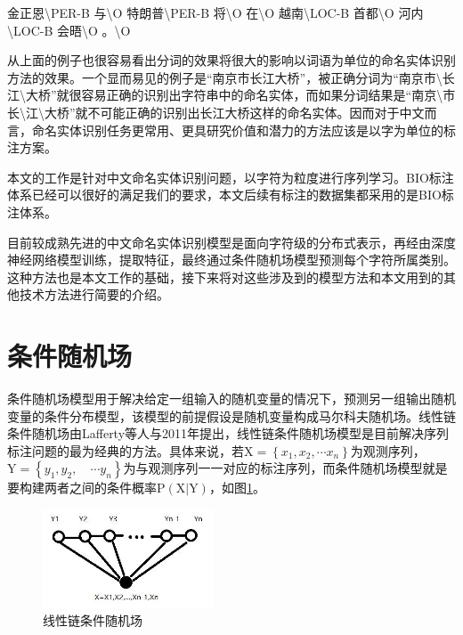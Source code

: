 \documentclass[winfonts,master,oneside,nobackinfo]{njuthesis}
\begin{document}
金正恩\textbackslash PER-B 与\textbackslash O 特朗普\textbackslash PER-B 将\textbackslash O 在\textbackslash O 越南\textbackslash LOC-B 首都\textbackslash O 河内\textbackslash LOC-B 会晤\textbackslash O 。\textbackslash O

从上面的例子也很容易看出分词的效果将很大的影响以词语为单位的命名实体识别方法的效果。一个显而易见的例子是“南京市长江大桥”，被正确分词为“南京市\textbackslash 长江\textbackslash 大桥”就很容易正确的识别出字符串中的命名实体，而如果分词结果是“南京\textbackslash 市长\textbackslash 江\textbackslash 大桥”就不可能正确的识别出长江大桥这样的命名实体。因而对于中文而言，命名实体识别任务更常用、更具研究价值和潜力的方法应该是以字为单位的标注方案。

本文的工作是针对中文命名实体识别问题，以字符为粒度进行序列学习。BIO标注体系已经可以很好的满足我们的要求，本文后续有标注的数据集都采用的是BIO标注体系。

目前较成熟先进的中文命名实体识别模型是面向字符级的分布式表示，再经由深度神经网络模型训练，提取特征，最终通过条件随机场模型预测每个字符所属类别。这种方法也是本文工作的基础，接下来将对这些涉及到的模型方法和本文用到的其他技术方法进行简要的介绍。

\section{条件随机场}
条件随机场模型用于解决给定一组输入的随机变量的情况下，预测另一组输出随机变量的条件分布模型，该模型的前提假设是随机变量构成马尔科夫随机场。线性链条件随机场由Lafferty等人\cite{Lafferty}与2011年提出，线性链条件随机场模型是目前解决序列标注问题的最为经典的方法。具体来说，若$\mathrm { X } = \left\{ x _ { 1 } , x _ { 2 } , \cdots x _ { n } \right\}$为观测序列，$\mathrm { Y } = \left\{ y _ { 1 } , y _ { 2 } , \quad \cdots y _ { n } \right\}$为与观测序列一一对应的标注序列，而条件随机场模型就是要构建两者之间的条件概率$\mathrm { P } ( \mathrm { X } | \mathrm { Y } )$，如图\ref{crf}。

\begin{figure}[ht]
\centering
\includegraphics[width=0.45\textwidth]{./figure/线性链条件随机场.jpg}
\caption{线性链条件随机场}
\label{crf}
\end{figure}
\end{document}
